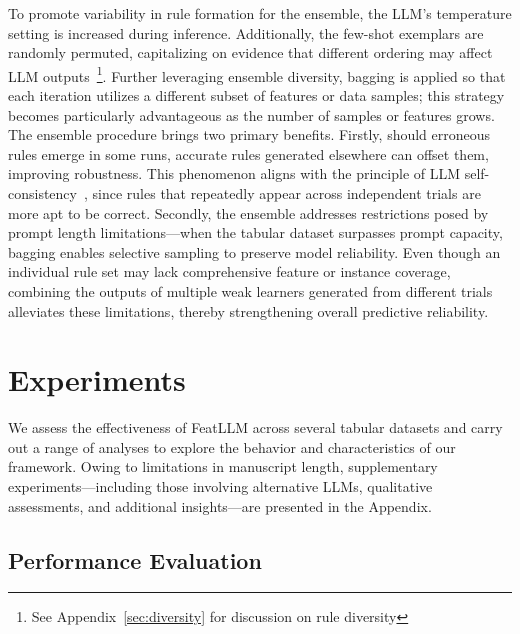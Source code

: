 To promote variability in rule formation for the ensemble, the LLM’s temperature setting is increased during inference. Additionally, the few-shot exemplars are randomly permuted, capitalizing on evidence that different ordering may affect LLM outputs~\cite{lu2022fantastically}\footnote{See Appendix~\ref{sec:diversity} for discussion on rule diversity}. Further leveraging ensemble diversity, bagging is applied so that each iteration utilizes a different subset of features or data samples; this strategy becomes particularly advantageous as the number of samples or features grows. The ensemble procedure brings two primary benefits. Firstly, should erroneous rules emerge in some runs, accurate rules generated elsewhere can offset them, improving robustness. This phenomenon aligns with the principle of LLM self-consistency~\cite{wang2022self}, since rules that repeatedly appear across independent trials are more apt to be correct. Secondly, the ensemble addresses restrictions posed by prompt length limitations—when the tabular dataset surpasses prompt capacity, bagging enables selective sampling to preserve model reliability. Even though an individual rule set may lack comprehensive feature or instance coverage, combining the outputs of multiple weak learners generated from different trials alleviates these limitations, thereby strengthening overall predictive reliability.

\section{Experiments}
We assess the effectiveness of \textsf{FeatLLM} across several tabular datasets and carry out a range of analyses to explore the behavior and characteristics of our framework. Owing to limitations in manuscript length, supplementary experiments—including those involving alternative LLMs, qualitative assessments, and additional insights—are presented in the Appendix.

\subsection{Performance Evaluation}
